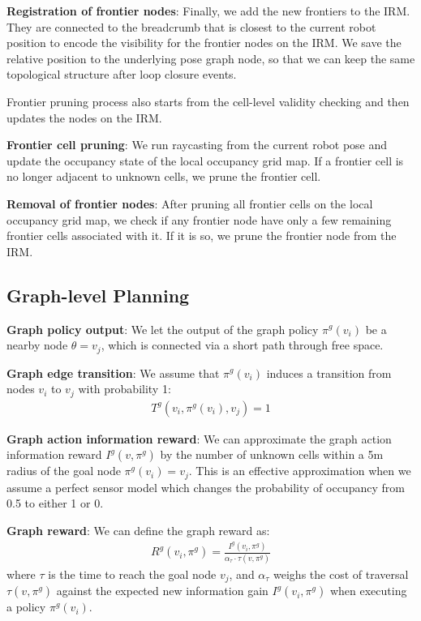 \documentclass{article}
\newcommand{\ph}[1]{{\textbf{#1}:}} %
\begin{document}
\ph{Registration of frontier nodes}
Finally, we add the new frontiers to the IRM.
They are connected to the breadcrumb that is closest to the current robot position to encode the visibility for the frontier nodes on the IRM.
We save the relative position to the underlying pose graph node, so that we can keep the same topological structure after loop closure events.

Frontier pruning process also starts from the cell-level validity checking and then updates the nodes on the IRM.

\ph{Frontier cell pruning}
We run raycasting from the current robot pose and update the occupancy state of the local occupancy grid map.
If a frontier cell is no longer adjacent to unknown cells, we prune the frontier cell.

\ph{Removal of frontier nodes}
After pruning all frontier cells on the local occupancy grid map, we check if any frontier node have only a few remaining frontier cells associated with it.
If it is so, we prune the frontier node from the IRM. 


\subsection{Graph-level Planning}


\ph{Graph policy output}
We let the output of the graph policy $\pi^g(v_i)$ be a nearby node $\theta=v_j$, which is connected via a short path through free space.

\ph{Graph edge transition}
We assume that $\pi^{g}(v_i)$ induces a  transition from nodes $v_i$ to $v_j$ with probability 1:
\begin{align}
    T^{g} (v_i, \pi^g(v_i), v_j) = 1
\end{align}

\ph{Graph action information reward}
We can approximate the graph action information reward $I^g(v, \pi^g)$ by the number of unknown cells within a 5m radius of the goal node $\pi^g(v_i)=v_j$.  This is an effective approximation when we assume a perfect sensor model which changes the probability of occupancy from 0.5 to either 1 or 0.  

\ph{Graph reward}
We can define the graph reward as:
\begin{align}
    R^g(v_i, \pi^g) = \frac{I^g(v_i,\pi^g)}{\alpha_\tau \cdot \tau(v,\pi^g)}
\end{align}
where $\tau$ is the time to reach the goal node $v_j$, and $\alpha_\tau$ weighs the cost of traversal $\tau(v,\pi^g)$ against the expected new information gain $I^g(v_i,\pi^g)$ when executing a policy $\pi^g(v_i)$.  
\end{document}
